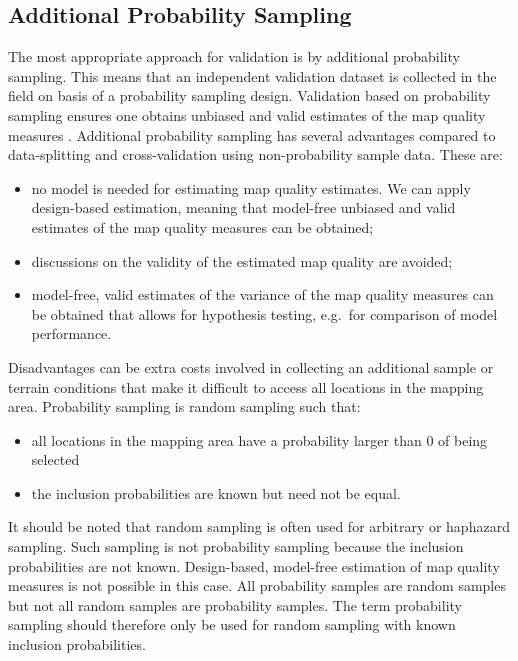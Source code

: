 \documentclass[10pt,b5paper,]{book}
\theoremstyle{definition}
\theoremstyle{definition}
\theoremstyle{definition}
\theoremstyle{remark}
\begin{document}
\hypertarget{additional-probability-sampling}{%
\subsection{Additional Probability
Sampling}\label{additional-probability-sampling}}

The most appropriate approach for validation is by additional
probability sampling. This means that an independent validation dataset
is collected in the field on basis of a probability sampling design.
Validation based on probability sampling ensures one obtains unbiased
and valid estimates of the map quality measures
\citep[\citet{stehman1999basic}]{brus2011sampling}. Additional
probability sampling has several advantages compared to data-splitting
and cross-validation using non-probability sample data. These are:

\begin{itemize}
\item
  no model is needed for estimating map quality estimates. We can apply
  design-based estimation, meaning that model-free unbiased and valid
  estimates of the map quality measures can be obtained;
\item
  discussions on the validity of the estimated map quality are avoided;
\item
  model-free, valid estimates of the variance of the map quality
  measures can be obtained that allows for hypothesis testing, e.g.~for
  comparison of model performance.
\end{itemize}

Disadvantages can be extra costs involved in collecting an additional
sample or terrain conditions that make it difficult to access all
locations in the mapping area. Probability sampling is random sampling
such that:

\begin{itemize}
\item
  all locations in the mapping area have a probability larger than 0 of
  being selected
\item
  the inclusion probabilities are known but need not be equal.
\end{itemize}

It should be noted that random sampling is often used for arbitrary or
haphazard sampling. Such sampling is not probability sampling because
the inclusion probabilities are not known. Design-based, model-free
estimation of map quality measures is not possible in this case. All
probability samples are random samples but not all random samples are
probability samples. The term probability sampling should therefore only
be used for random sampling with known inclusion probabilities.
\end{document}
